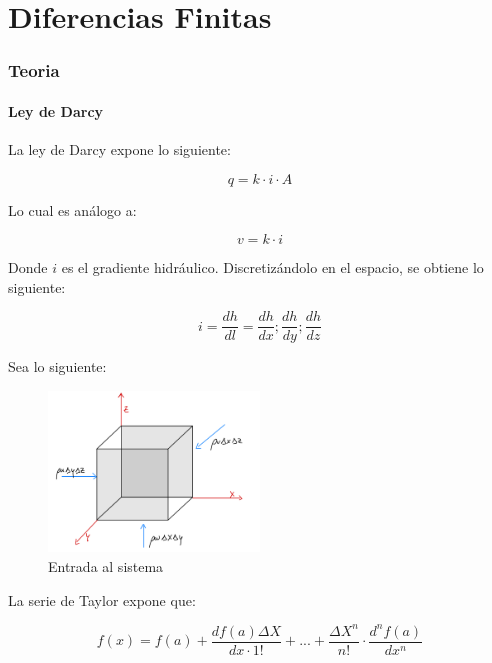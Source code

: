 \part{Diferencias Finitas}

\section{Teoria}

\subsection{Ley de Darcy}

La ley de Darcy expone lo siguiente:

\begin{equation}
    q = k \cdot i \cdot A
\end{equation}

Lo cual es análogo a:

\begin{equation}
    v = k \cdot i
\end{equation}

Donde \(i\) es el gradiente hidráulico. Discretizándolo en el espacio, se obtiene lo siguiente:

\begin{equation}
    i = \frac{dh}{dl} = \frac{dh}{dx}; \frac{dh}{dy}; \frac{dh}{dz}
\end{equation}

Sea lo siguiente:

\begin{figure}[H]
    \centering
    \includegraphics[width=0.5\textwidth]{FOTOS/in.jpg}
    \caption{Entrada al sistema}
    \label{fig:ley_darcy_in}
\end{figure}

La serie de Taylor expone que:

\begin{equation}
    f(x) = f(a) + \frac{df(a) \Delta X}{dx \cdot 1!} + ... + \frac{\Delta X^n}{n!} \cdot \frac{d^n f(a)}{dx^n}
\end{equation}

